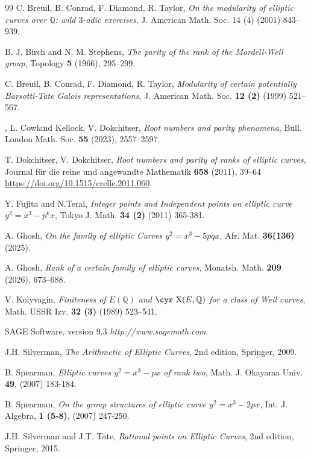 \documentclass[12pt]{amsart}
\newcommand{\bbQ}{\mathbb{Q}}
\newcommand{\Sha}{\hbox{\cyr X}}
\numberwithin{equation}{section}
\theoremstyle{definition}
\begin{document}
\begin{thebibliography}{99}
C. Breuil, B. Conrad, F. Diamond, R. Taylor,
\emph{On the modularity of elliptic curves over $\bbQ$: wild $3$-adic exercises},
J. American Math. Soc. {14 (4)} (2001) 843--939.

B. J. Birch and N. M. Stephens,
\emph{The parity of the rank of the Mordell-Well group},
Topology {\bf 5} (1966), 295--299.

C. Breuil, B. Conrad, F. Diamond, R. Taylor,
\emph{Modularity of certain potentially Barsotti-Tate Galois representations},
J. American Math. Soc. {\bf 12 (2)} (1999) 521--567.

,
L. Cowland Kellock, V. Dokchitser,
\emph{Root numbers and parity phenomena},
Bull. London Math. Soc. {\bf 55} (2023), 2557--2597.

T. Dokchitser, V. Dokchitser,
\emph{Root numbers and parity of ranks of elliptic curves},
Journal f\"{u}r die reine und angewandte Mathematik {\bf 658} (2011), 39--64
\url{https://doi.org/10.1515/crelle.2011.060}.

Y. Fujita and N.Terai, 
\emph{Integer points and Independent points on elliptic curve $y^{2} = x^{3}- p^{k}x$}, 
Tokyo J. Math. {\bf 34 (2)} (2011) 365-381.


A. Ghosh, 
\emph{On the family of elliptic Curves $y^{2} =x^{3} -5pqx$}, 
Afr. Mat. {\bf 36(136)} (2025).



A. Ghosh,
\emph{Rank of a certain family of elliptic curves},
Monatsh. Math. {\bf 209} (2026), 673--688.


V. Kolyvagin,
\emph{Finiteness of $E(\bbQ)$ and $\Sha(E,\bbQ)$ for a class of Weil curves},
Math. USSR Izv. {\bf 32 (3)} (1989) 523--541.


SAGE Software, version 9.3
\textit{http://www.sagemath.com}.


J.H. Silverman,
\emph{The Arithmetic of Elliptic Curves},
2nd edition, Springer, 2009.

 B. Spearman, \emph{Elliptic curves $y^{2} = x^{3} -px$ of rank two}, 
Math. J. Okayama Univ. {\bf 49}, (2007) 183-184.

 B. Spearman, \emph{On the group structures of elliptic curve $y^{2} = x^{3} -2px$}, 
Int. J. Algebra, {\bf 1 (5-8)}, (2007) 247-250.


J.H. Silverman and J.T. Tate,
\emph{Rational points on Elliptic Curves},
2nd edition, Springer, 2015.
\end{thebibliography}
\end{document}
